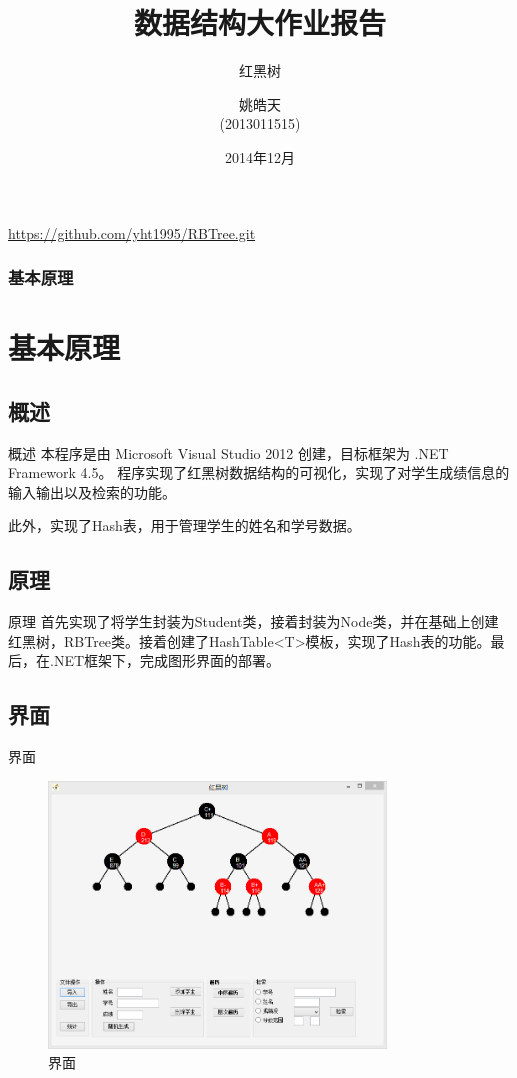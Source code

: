 \documentclass{beamer}
\begin{document}
\title{数据结构大作业报告}
\subtitle{红黑树}
\author{姚皓天\\(2013011515)}

\date{2014年12月}
\subject{数据结构}

\begin{frame} 
\titlepage 
\begin{center}
\url{https://github.com/yht1995/RBTree.git}
\end{center}
\end{frame} 
\begin{frame}
\frametitle{基本原理}
\section{基本原理}
\subsection{概述}
\begin{block}{概述}
本程序是由 Microsoft Visual Studio 2012 创建，目标框架为 .NET Framework 4.5。
程序实现了红黑树数据结构的可视化，实现了对学生成绩信息的输入输出以及检索的功能。\par
此外，实现了Hash表，用于管理学生的姓名和学号数据。
\end{block}
\subsection{原理}
\begin{block}{原理}
首先实现了将学生封装为Student类，接着封装为Node类，并在基础上创建红黑树，RBTree类。接着创建了HashTable<T>模板，实现了Hash表的功能。最后，在.NET框架下，完成图形界面的部署。
\end{block}
\end{frame}

\begin{frame}
\subsection{界面}
\begin{block}{界面}
\begin{figure}[H]
\centering
\includegraphics[width=0.8\textwidth]{2.png}
\caption{界面} 
\end{figure}
\end{block}
\end{frame}
\end{document}
